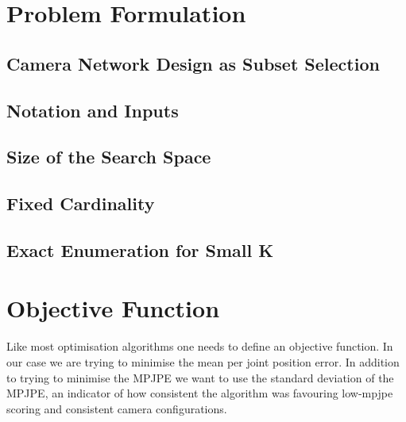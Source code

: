 \label{chap:optimisation}

\section{Problem Formulation}
\label{sec:formulation}

\subsection{Camera Network Design as Subset Selection}
\cite{olague2001applications, zhao2013approximate}

\subsection{Notation and Inputs}

\subsection{Size of the Search Space}

\subsection{Fixed Cardinality}

\subsection{Exact Enumeration for Small K}

\section{Objective Function}
\label{sec:objectivefunction}

Like most optimisation algorithms one needs to define an objective function. In our case we are trying to minimise the mean per joint position error. In addition to trying to minimise the MPJPE we want to use the standard deviation of the MPJPE, an indicator of how consistent the algorithm was favouring low-mpjpe scoring and consistent camera configurations.

